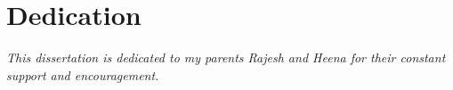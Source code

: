 \chapter*{Dedication}
\begin{center}
{\centering \it  This dissertation is dedicated to my parents Rajesh and Heena for their constant support and encouragement.}
\end{center} 